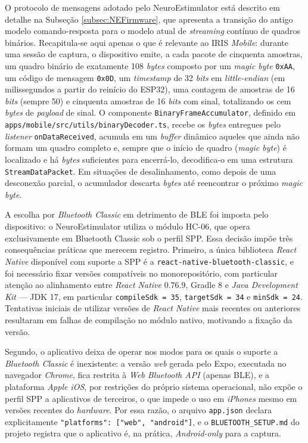 O protocolo de mensagens adotado pelo NeuroEstimulator está descrito em detalhe na Subseção \ref{subsec:NEFirmware}, que apresenta a transição do antigo modelo comando-resposta para o modelo atual de \textit{streaming} contínuo de quadros binários. Recapitula-se aqui apenas o que é relevante ao IRIS \textit{Mobile}: durante uma sessão de captura, o dispositivo emite, a cada pacote de cinquenta amostras, um quadro binário de exatamente 108 \textit{bytes} composto por um \textit{magic byte} \texttt{0xAA}, um código de mensagem \texttt{0x0D}, um \textit{timestamp} de 32 \textit{bits} em \textit{little-endian} (em milissegundos a partir do reinício do ESP32), uma contagem de amostras de 16 \textit{bits} (sempre 50) e cinquenta amostras de 16 \textit{bits} com sinal, totalizando os cem \textit{bytes} de \textit{payload} de sinal. O componente \texttt{BinaryFrameAccumulator}, definido em \texttt{apps/mobile/src/utils/binaryDecoder.ts}, recebe os \textit{bytes} entregues pelo \textit{listener} \texttt{onDataReceived}, acumula em um \textit{buffer} dinâmico aqueles que ainda não formam um quadro completo e, sempre que o início de quadro (\textit{magic byte}) é localizado e há \textit{bytes} suficientes para encerrá-lo, decodifica-o em uma estrutura \texttt{StreamDataPacket}. Em situações de desalinhamento, como depois de uma desconexão parcial, o acumulador descarta \textit{bytes} até reencontrar o próximo \textit{magic byte}.

A escolha por \textit{Bluetooth Classic} em detrimento de  BLE foi imposta pelo dispositivo: o NeuroEstimulator utiliza o módulo HC-06, que opera exclusivamente em Bluetooth Classic sob o perfil SPP. Essa decisão impõe três consequências práticas que merecem registro. Primeiro, a única biblioteca \textit{React Native} disponível com suporte a SPP é a \texttt{react-native-bluetooth-classic}, e foi necessário fixar versões compatíveis no monorepositório, com particular atenção ao alinhamento entre \textit{React Native} 0.76.9, Gradle 8 e \textit{Java Development Kit} --- JDK 17, em particular \texttt{compileSdk = 35}, \texttt{targetSdk = 34} e \texttt{minSdk = 24}. Tentativas iniciais de utilizar versões de \textit{React Native} mais recentes ou anteriores resultaram em falhas de compilação no módulo nativo, motivando a fixação da versão. 

Segundo, o aplicativo deixa de operar nos modos para os quais o suporte a \textit{Bluetooth Classic} é inexistente: a versão \textit{web} gerada pelo Expo, executada no navegador \textit{Chrome}, fica restrita à \textit{Web Bluetooth API} (apenas BLE), e a plataforma \textit{Apple iOS}, por restrições do próprio sistema operacional, não expõe o perfil SPP a aplicativos de terceiros, o que impede o uso em \textit{iPhones} mesmo em versões recentes do \textit{hardware}. Por essa razão, o arquivo \texttt{app.json} declara explicitamente \texttt{"platforms": ["web", "android"]}, e o \texttt{BLUETOOTH\_SETUP.md} do projeto registra que o aplicativo é, na prática, \textit{Android-only} para a captura. 

